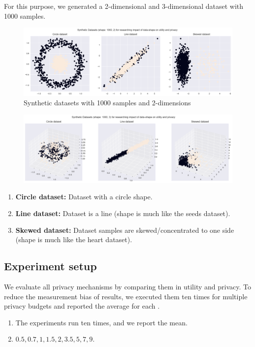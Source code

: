 For this purpose, we generated a 2-dimensional and 3-dimensional dataset with 1000 samples.
\begin{figure}[H]
    \includegraphics[width=1.0\textwidth]{Method//images/2d-shapes.png}
    \caption{Synthetic datasets with 1000 samples and 2-dimensions}
    \label{rq3:synthetic-datasets}
\end{figure}
\begin{figure}[H]
    \includegraphics[width=1.0\textwidth]{3d-shapes.png}
    \label{rq3:synthetic-datasets-3d}
\end{figure}

\begin{enumerate}
    \item \textbf{Circle dataset:} Dataset with a circle shape.
    \item \textbf{Line dataset:} Dataset is a line (shape is much like the seeds dataset).
    \item \textbf{Skewed dataset:} Dataset samples are skewed/concentrated to one side (shape is much like the heart dataset).
\end{enumerate}
\newpage
\subsection{Experiment setup}
We evaluate all privacy mechanisms by comparing them in utility and privacy.
To reduce the measurement bias of results, we executed them ten times for multiple privacy budgets and reported the average for each \citep{9679364}.
\begin{enumerate}
    \item The experiments run ten times, and we report the mean.
    \item {} ${0.5, 0.7, 1, 1.5, 2, 3.5, 5, 7, 9}$.
\end{enumerate}

